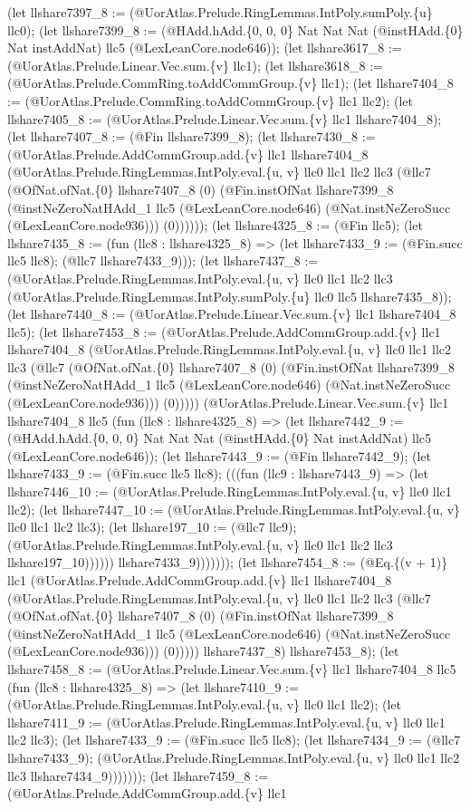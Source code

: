 \documentclass[11pt]{article}
\begin{document}
(let llshare7397\_8 := (@UorAtlas.Prelude.RingLemmas.IntPoly.sumPoly.\{u\} llc0); (let llshare7399\_8 := (@HAdd.hAdd.\{0, 0, 0\} Nat Nat Nat (@instHAdd.\{0\} Nat instAddNat) llc5 (@LexLeanCore.node646)); (let llshare3617\_8 := (@UorAtlas.Prelude.Linear.Vec.sum.\{v\} llc1); (let llshare3618\_8 := (@UorAtlas.Prelude.CommRing.toAddCommGroup.\{v\} llc1); (let llshare7404\_8 := (@UorAtlas.Prelude.CommRing.toAddCommGroup.\{v\} llc1 llc2); (let llshare7405\_8 := (@UorAtlas.Prelude.Linear.Vec.sum.\{v\} llc1 llshare7404\_8); (let llshare7407\_8 := (@Fin llshare7399\_8); (let llshare7430\_8 := (@UorAtlas.Prelude.AddCommGroup.add.\{v\} llc1 llshare7404\_8 (@UorAtlas.Prelude.RingLemmas.IntPoly.eval.\{u, v\} llc0 llc1 llc2 llc3 (@llc7 (@OfNat.ofNat.\{0\} llshare7407\_8 (0) (@Fin.instOfNat llshare7399\_8 (@instNeZeroNatHAdd\_1 llc5 (@LexLeanCore.node646) (@Nat.instNeZeroSucc (@LexLeanCore.node936))) (0)))))); (let llshare4325\_8 := (@Fin llc5); (let llshare7435\_8 := (fun (llc8 : llshare4325\_8) => (let llshare7433\_9 := (@Fin.succ llc5 llc8); (@llc7 llshare7433\_9))); (let llshare7437\_8 := (@UorAtlas.Prelude.RingLemmas.IntPoly.eval.\{u, v\} llc0 llc1 llc2 llc3 (@UorAtlas.Prelude.RingLemmas.IntPoly.sumPoly.\{u\} llc0 llc5 llshare7435\_8)); (let llshare7440\_8 := (@UorAtlas.Prelude.Linear.Vec.sum.\{v\} llc1 llshare7404\_8 llc5); (let llshare7453\_8 := (@UorAtlas.Prelude.AddCommGroup.add.\{v\} llc1 llshare7404\_8 (@UorAtlas.Prelude.RingLemmas.IntPoly.eval.\{u, v\} llc0 llc1 llc2 llc3 (@llc7 (@OfNat.ofNat.\{0\} llshare7407\_8 (0) (@Fin.instOfNat llshare7399\_8 (@instNeZeroNatHAdd\_1 llc5 (@LexLeanCore.node646) (@Nat.instNeZeroSucc (@LexLeanCore.node936))) (0))))) (@UorAtlas.Prelude.Linear.Vec.sum.\{v\} llc1 llshare7404\_8 llc5 (fun (llc8 : llshare4325\_8) => (let llshare7442\_9 := (@HAdd.hAdd.\{0, 0, 0\} Nat Nat Nat (@instHAdd.\{0\} Nat instAddNat) llc5 (@LexLeanCore.node646)); (let llshare7443\_9 := (@Fin llshare7442\_9); (let llshare7433\_9 := (@Fin.succ llc5 llc8); (((fun (llc9 : llshare7443\_9) => (let llshare7446\_10 := (@UorAtlas.Prelude.RingLemmas.IntPoly.eval.\{u, v\} llc0 llc1 llc2); (let llshare7447\_10 := (@UorAtlas.Prelude.RingLemmas.IntPoly.eval.\{u, v\} llc0 llc1 llc2 llc3); (let llshare197\_10 := (@llc7 llc9); (@UorAtlas.Prelude.RingLemmas.IntPoly.eval.\{u, v\} llc0 llc1 llc2 llc3 llshare197\_10)))))) llshare7433\_9))))))); (let llshare7454\_8 := (@Eq.\{(v + 1)\} llc1 (@UorAtlas.Prelude.AddCommGroup.add.\{v\} llc1 llshare7404\_8 (@UorAtlas.Prelude.RingLemmas.IntPoly.eval.\{u, v\} llc0 llc1 llc2 llc3 (@llc7 (@OfNat.ofNat.\{0\} llshare7407\_8 (0) (@Fin.instOfNat llshare7399\_8 (@instNeZeroNatHAdd\_1 llc5 (@LexLeanCore.node646) (@Nat.instNeZeroSucc (@LexLeanCore.node936))) (0))))) llshare7437\_8) llshare7453\_8); (let llshare7458\_8 := (@UorAtlas.Prelude.Linear.Vec.sum.\{v\} llc1 llshare7404\_8 llc5 (fun (llc8 : llshare4325\_8) => (let llshare7410\_9 := (@UorAtlas.Prelude.RingLemmas.IntPoly.eval.\{u, v\} llc0 llc1 llc2); (let llshare7411\_9 := (@UorAtlas.Prelude.RingLemmas.IntPoly.eval.\{u, v\} llc0 llc1 llc2 llc3); (let llshare7433\_9 := (@Fin.succ llc5 llc8); (let llshare7434\_9 := (@llc7 llshare7433\_9); (@UorAtlas.Prelude.RingLemmas.IntPoly.eval.\{u, v\} llc0 llc1 llc2 llc3 llshare7434\_9))))))); (let llshare7459\_8 := (@UorAtlas.Prelude.AddCommGroup.add.\{v\} llc1 
\end{document}
